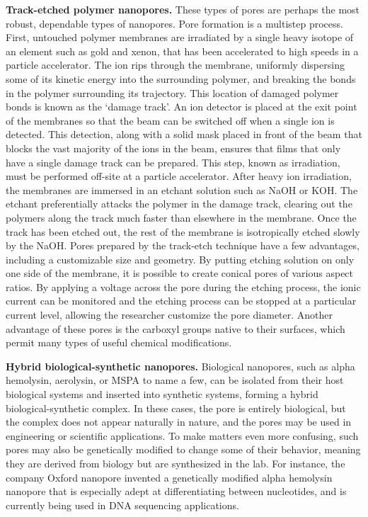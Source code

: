			\textbf{Track-etched polymer nanopores.} These types of pores are perhaps the most robust, dependable types of nanopores. Pore formation is a multistep process. First, untouched polymer membranes are irradiated by a single heavy isotope of an element such as gold and xenon, that has been accelerated to high speeds in a particle accelerator. The ion rips through the membrane, uniformly dispersing some of its kinetic energy into the surrounding polymer, and breaking the bonds in the polymer surrounding its trajectory. This location of damaged polymer bonds is known as the `damage track'. An ion detector is placed at the exit point of the membranes so that the beam can be switched off when a single ion is detected. This detection, along with a solid mask placed in front of the beam that blocks the vast majority of the ions in the beam, ensures that films that only have a single damage track can be prepared. This step, known as irradiation, must be performed off-site at a particle accelerator. After heavy ion irradiation, the membranes are immersed in an etchant solution such as NaOH or KOH. The etchant preferentially attacks the polymer in the damage track, clearing out the polymers along the track much faster than elsewhere in the membrane. Once the track has been etched out, the rest of the membrane is isotropically etched slowly by the NaOH. Pores prepared by the track-etch technique have a few advantages, including a customizable size and geometry. By putting etching solution on only one side of the membrane, it is possible to create conical pores of various aspect ratios. By applying a voltage across the pore during the etching process, the ionic current can be monitored and the etching process can be stopped at a particular current level, allowing the researcher customize the pore diameter. Another advantage of these pores is the carboxyl groups native to their surfaces, which permit many types of useful chemical modifications.

			\textbf{Hybrid biological-synthetic nanopores.} Biological nanopores, such as alpha hemolysin, aerolysin, or MSPA to name a few, can be isolated from their host biological systems and inserted into synthetic systems, forming a hybrid biological-synthetic complex. In these cases, the pore is entirely biological, but the complex does not appear naturally in nature, and the pores may be used in engineering or scientific applications. To make matters even more confusing, such pores may also be genetically modified to change some of their behavior, meaning they are derived from biology but are synthesized in the lab. For instance, the company Oxford nanopore invented a genetically modified alpha hemolysin nanopore that is especially adept at differentiating between nucleotides, and is currently being used in DNA sequencing applications.


